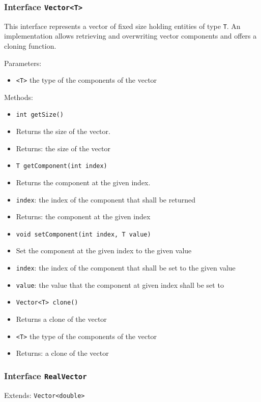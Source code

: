 \documentclass[parskip=full,11pt]{scrartcl}
\begin{document}
\subsubsection{Interface \texttt{Vector<T>}}
This interface represents a vector of fixed size holding entities of type \texttt{T}. An implementation allows retrieving and overwriting vector components and offers a cloning function.

Parameters:
\begin{itemize}\itemsep -10pt
\item \texttt{<T>} the type of the components of the vector
\end{itemize}

Methods:
\begin{itemize}\itemsep -10pt
\item \texttt{int getSize()}
\item[] Returns the size of the vector.
\item[] Returns: the size of the vector

\item \texttt{T getComponent(int index)}
\item[] Returns the component at the given index.
\item[] \texttt{index}: the index of the component that shall be returned
\item[] Returns: the component at the given index

\item \texttt{void setComponent(int index, T value)}
\item[] Set the component at the given index to the given value
\item[] \texttt{index}: the index of the component that shall be set to the given value
\item[] \texttt{value}: the value that the component at given index shall be set to

\item \texttt{Vector<T> clone()}
\item[] Returns a clone of the vector
\item[] \texttt{<T>} the type of the components of the vector
\item[] Returns: a clone of the vector
\end{itemize}

\subsubsection{Interface \texttt{RealVector}}
Extends: \texttt{Vector<double>}
\end{document}
